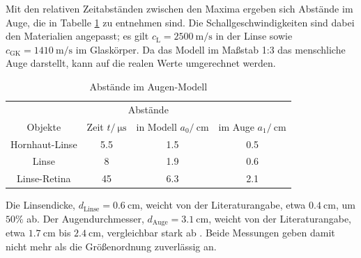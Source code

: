 Mit den relativen Zeitabständen zwischen den Maxima ergeben sich Abstände im Auge, die in Tabelle \ref{tab:auge} zu entnehmen sind.
Die Schallgeschwindigkeiten sind dabei den Materialien angepasst; es gilt $c_\text{L} = \SI{2500}{\meter\per\second}$ in der Linse sowie $c_\text{GK} = \SI{1410}{\meter\per\second}$ im Glaskörper.
Da das Modell im Maßstab 1:3 das menschliche Auge darstellt, kann auf die realen Werte umgerechnet werden.
\begin{table}[h]
	\centering
	\begin{tabular}{cccc}
	\toprule
	\multicolumn{4}{c}{Abstände}\\
	{Objekte}&{Zeit $t/\:\si{\micro\second}$}&{in Modell $a_0/\:\si{\centi\meter}$}&{im Auge $a_1/\:\si{\centi\meter}$}\\
	\midrule
		{Hornhaut-Linse}&{5.5}&{1.5}&{0.5}\\
		{Linse}&{8}&{1.9}&{0.6}\\
		{Linse-Retina}&{45}&{6.3}&{2.1}\\
	\bottomrule
	\end{tabular}
	\caption{Abstände im Augen-Modell}
	\label{tab:auge}
\end{table}

Die Linsendicke, $d_\text{Linse}=\SI{0.6}{\centi\meter}$, weicht von der Literaturangabe, etwa $\SI{0.4}{\centi\meter}$, um $50\%$ ab.
Der Augendurchmesser, $d_\text{Auge}=\SI{3.1}{\centi\meter}$, weicht von der Literaturangabe, etwa $\SI{1.7}{\centi\meter}$ bis $\SI{2.4}{\centi\meter}$, vergleichbar stark ab \cite{medizinmann}.
Beide Messungen geben damit nicht mehr als die Größenordnung zuverlässig an.